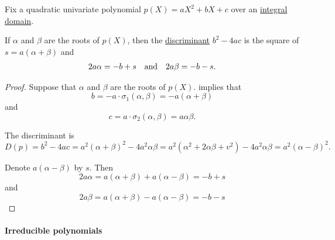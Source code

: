 \begin{proposition}\label{thm:quadratic_polynomial_roots}
  Fix a quadratic univariate polynomial \( p(X) = aX^2 + b X + c \) over an \hyperref[def:integral_domain]{integral domain}.

  If \( \alpha \) and \( \beta \) are the roots of \( p(X) \), then the \hyperref[def:discriminant]{discriminant} \( b^2 - 4ac \) is the square of \( s = a(\alpha + \beta) \) and
  \begin{align*}
    2a\alpha = -b + s
    &&\T{and}&&
    2a\beta = -b - s.
  \end{align*}
\end{proposition}
\begin{proof}
  Suppose that \( \alpha \) and \( \beta \) are the roots of \( p(X) \).  implies that
  \begin{equation*}
    b =  -a \cdot \sigma_1(\alpha, \beta) = -a(\alpha + \beta)
  \end{equation*}
  and
  \begin{equation*}
    c = a \cdot \sigma_2(\alpha, \beta) = a\alpha\beta.
  \end{equation*}

  The discriminant is
  \begin{equation*}
    D(p) = b^2 - 4ac = a^2(\alpha + \beta)^2 - 4a^2 \alpha\beta = a^2 (\alpha^2 + 2\alpha\beta + v^2) - 4a^2 \alpha\beta = a^2 (\alpha - \beta)^2.
  \end{equation*}

  Denote \( a(\alpha - \beta) \) by \( s \). Then
  \begin{equation*}
    2a\alpha = a(\alpha + \beta) + a(\alpha - \beta) = -b + s
  \end{equation*}
  and
  \begin{equation*}
    2a\beta = a(\alpha + \beta) - a(\alpha - \beta) = -b - s
  \end{equation*}
\end{proof}

\paragraph{Irreducible polynomials}

